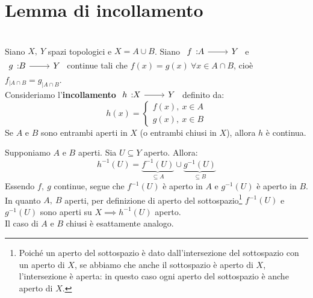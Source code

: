 \section{Lemma di incollamento}
\begin{lemming}~{}\label{lemmaincollamento}\\
Siano $X,\ Y$ spazi topologici e $X=A\cup B$. Siano $\funz{f}{A}{Y}$ e $\funz{g}{B}{Y}$ continue tali che $f\left(x\right)=g\left(x\right)\ \forall x\in A\cap B$, cioè $f_{\mid A\cap B}=g_{\mid A\cap B}$.\\
Consideriamo l'\textbf{incollamento} $\funz{h}{X}{Y}$ definito da:
	\begin{equation}
		h\left(x\right)=\begin{cases}
			f\left(x\right),\ x\in A\\
			g\left(x\right),\ x\in B
		\end{cases}
	\end{equation}
	Se $A$ e $B$ sono entrambi aperti in $X$ (o entrambi chiusi in $X$), allora $h$ è continua.
\end{lemming}
\begin{demonstration}
	Supponiamo $A$ e $B$ aperti. Sia $U\subseteq Y$ aperto. Allora:
	\begin{equation*}
		h^{-1}\left(U\right)=\underbrace{f^{-1}\left(U\right)}_{\subseteq A}\cup \underbrace{g^{-1}\left(U\right)}_{\subseteq B}
	\end{equation*}
Essendo $f,\ g$ continue, segue che $f^{-1}\left(U\right)$ è aperto in $A$ e $g^{-1}\left(U\right)$ è aperto in $B$.\\
In quanto $A,\ B$ aperti, per definizione di aperto del sottospazio\footnote{Poiché un aperto del sottospazio è dato dall'intersezione del sottospazio con un aperto di $X$, se abbiamo che anche il sottospazio è aperto di $X$, l'intersezione è aperta: in questo caso ogni aperto del sottospazio è anche aperto di $X$.} $f^{-1}\left(U\right)$ e $g^{-1}\left(U\right)$ sono aperti su $X\implies h^{-1}\left(U\right)$ aperto.\\
Il caso di $A$ e $B$ chiusi è esattamente analogo.
\end{demonstration}
